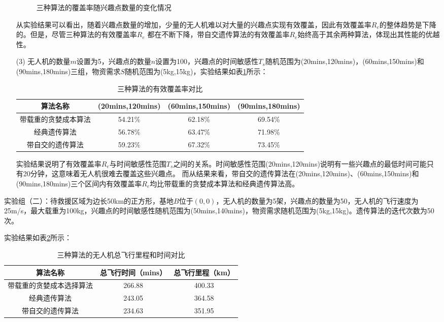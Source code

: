 \begin{itemize}
\begin{figure}[H]
        \caption{三种算法的覆盖率随兴趣点数量的变化情况}
        \label{fg502}
    \end{figure}
    从实验结果可以看出，随着兴趣点数量的增加，少量的无人机难以对大量的兴趣点实现有效覆盖，因此有效覆盖率$R_e$的整体趋势是下降的。但是，尽管三种算法的有效覆盖率$R_e$
    都在不断下降，带自交遗传算法的有效覆盖率$R_e$始终高于其余两种算法，体现出其性能的优越性。
    \item [(3)]无人机的数量$m$设置为5，兴趣点的数量$n$设置为100，兴趣点的时间敏感性$T_s$随机范围为(20mins,120mins)，(60mins,150mins)和(90mins,180mins)三组，物资需求$S$随机范围为(5kg,15kg)，实验结果如表\ref{table2}所示：
    \begin{table}[htbp]
        \vspace{0.5em}\centering\wuhao
        \caption{三种算法的有效覆盖率对比}\label{table2}
        \begin{tabular}{cccc}
        \toprule[1.5pt]
        算法名称 & (20mins,120mins) & (60mins,150mins) & (90mins,180mins) \\
        \midrule[1.5pt]
        带载重的贪婪成本算法 & 54.21\% & 62.18\% & 69.54\%\\
        经典遗传算法 & 56.78\% & 63.47\% & 71.98\% \\
        带自交的遗传算法 & 59.23\% & 67.32\% & 73.45\% \\
        \bottomrule[1.5pt]
        \end{tabular}
        \end{table}
    
    
        实验结果说明了有效覆盖率$R_e$与时间敏感性范围$T_s$之间的关系。时间敏感性范围(20mins,120mins)说明有一些兴趣点的最低时间可能只有20分钟，这意味着无人机很难去覆盖这些兴趣点。
    而从结果来看，带自交的遗传算法在(20mins,120mins)、(60mins,150mins)和(90mins,180mins)三个区间内有效覆盖率$R_e$均比带载重的贪婪成本算法和经典遗传算法高。
\end{itemize}


实验组（二）：待救援区域为边长50km的正方形，基地$B$位于$(0,0)$，无人机的数量为5架，兴趣点的数量为50，无人机的飞行速度为25m/s，最大载重为100kg，兴趣点的时间敏感性随机范围为(50mins,140mins)，物资需求随机范围为(5kg,15kg)。遗传算法的迭代次数为50次。


实验结果如表\ref{table3}所示：
\begin{table}[htbp]
    \vspace{0.5em}\centering\wuhao
    \caption{三种算法的无人机总飞行里程和时间对比}\label{table3}
    \begin{tabular}{ccc}
    \toprule[1.5pt]
    算法名称 & 总飞行时间（mins） & 总飞行里程（km） \\
    \midrule[1.5pt]
    带载重的贪婪成本选择算法 & 266.88 & 400.33 \\
    经典遗传算法 & 243.05 & 364.58 \\
    带自交的遗传算法 & 234.63 & 351.95 \\
    \bottomrule[1.5pt]
    \end{tabular}
    \end{table}


